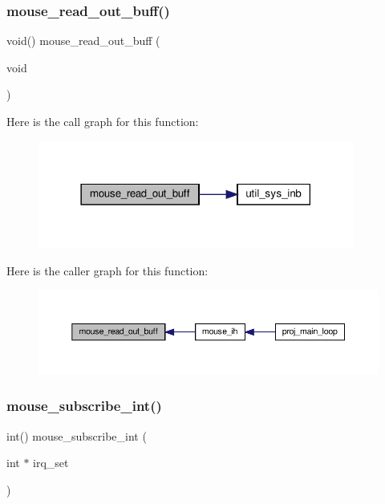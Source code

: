 \subsubsection{\texorpdfstring{mouse\+\_\+read\+\_\+out\+\_\+buff()}{mouse\_read\_out\_buff()}}
{\footnotesize\ttfamily void() mouse\+\_\+read\+\_\+out\+\_\+buff (\begin{DoxyParamCaption}\item[{void}]{ }\end{DoxyParamCaption})}

Here is the call graph for this function\+:\nopagebreak
\begin{figure}[H]
\begin{center}
\leavevmode
\includegraphics[width=294pt]{group__mouse_ga3f43ee9f00f28eb503b80a8589216e5f_cgraph}
\end{center}
\end{figure}
Here is the caller graph for this function\+:\nopagebreak
\begin{figure}[H]
\begin{center}
\leavevmode
\includegraphics[width=350pt]{group__mouse_ga3f43ee9f00f28eb503b80a8589216e5f_icgraph}
\end{center}
\end{figure}
\mbox{\label{group__mouse_gaf55e4d1ccae1ac1f59dfa4222fd5de8e}} 
\subsubsection{\texorpdfstring{mouse\+\_\+subscribe\+\_\+int()}{mouse\_subscribe\_int()}}
{\footnotesize\ttfamily int() mouse\+\_\+subscribe\+\_\+int (\begin{DoxyParamCaption}\item[{int $\ast$}]{irq\+\_\+set }\end{DoxyParamCaption})}


